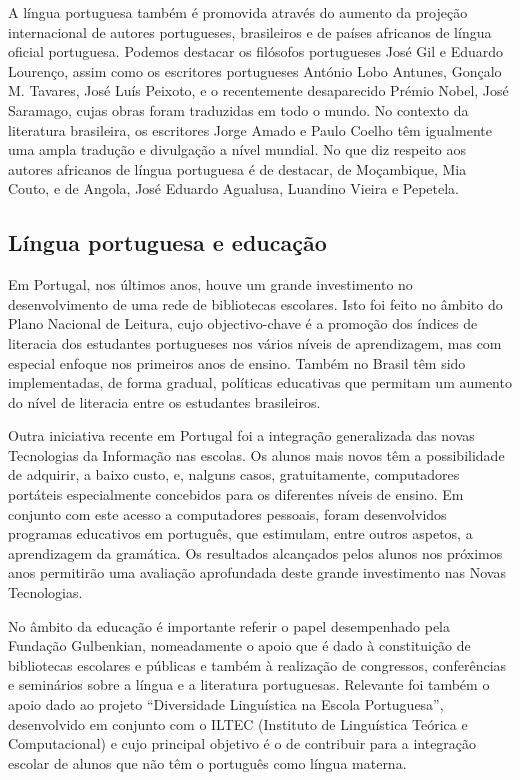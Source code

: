 \begin{multicols}{2}
A língua portuguesa também é promovida através do aumento da projeção internacional de autores portugueses, brasileiros e de países africanos de língua oficial portuguesa. Podemos destacar os filósofos portugueses José Gil e Eduardo Lourenço, assim como os escritores portugueses António Lobo Antunes, Gonçalo M. Tavares, José Luís Peixoto, e o recentemente desaparecido Prémio Nobel, José Saramago, cujas obras foram traduzidas em todo o mundo. No contexto da literatura brasileira, os escritores Jorge Amado e Paulo Coelho têm igualmente uma ampla tradução e divulgação a nível mundial. No que diz respeito aos autores africanos de língua portuguesa é de destacar, de Moçambique, Mia Couto, e de Angola, José Eduardo Agualusa, Luandino Vieira e Pepetela.

\subsection{Língua portuguesa e educação}

Em Portugal, nos últimos anos, houve um grande investimento no desenvolvimento de uma rede de bibliotecas escolares. Isto foi feito no âmbito do Plano Nacional de Leitura, cujo objectivo-chave é a promoção dos índices de literacia dos estudantes portugueses nos vários níveis de aprendizagem, mas com especial enfoque nos primeiros anos de ensino. Também no Brasil têm sido implementadas, de forma gradual, políticas educativas que permitam um aumento do nível de literacia entre os estudantes brasileiros.

Outra iniciativa recente em Portugal foi a integração generalizada das novas Tecnologias da Informação nas escolas. Os alunos mais novos têm a possibilidade de adquirir, a baixo custo, e, nalguns casos, gratuitamente, computadores portáteis especialmente concebidos para os diferentes níveis de ensino. Em conjunto com este acesso a computadores pessoais, foram desenvolvidos programas educativos em português, que estimulam, entre outros aspetos, a aprendizagem da gramática. Os resultados alcançados pelos alunos nos próximos anos permitirão uma avaliação aprofundada deste grande investimento nas Novas Tecnologias.


No âmbito da educação é importante referir o papel desempenhado pela Fundação Gulbenkian, nomeadamente o apoio que é dado à constituição de bibliotecas escolares e públicas e também à rea\-li\-za\-ção de congressos, conferências e seminários sobre a língua e a literatura portuguesas. Relevante foi também o apoio dado ao projeto “Diversidade Linguística na Escola Portuguesa”\cite{gulbenkian2}, desenvolvido em conjunto com o ILTEC (Instituto de Linguística Teórica e Computacional) e cujo principal objetivo é o de contribuir para a integração escolar de alunos que não têm o português como língua materna.


\end{multicols}
